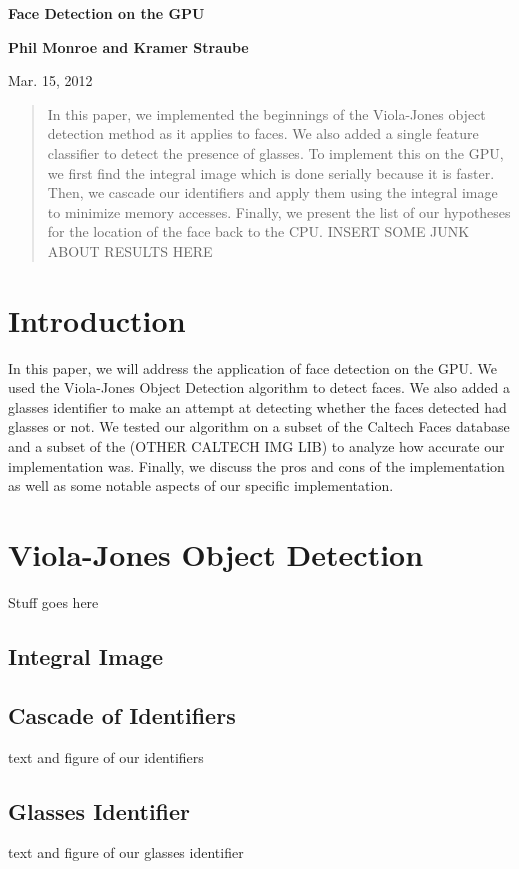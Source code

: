 \documentclass[12pt] {article}
\begin{document}
\centerline{\Large \bf Face Detection on the GPU}

\centerline{\bf Phil Monroe and Kramer Straube}

\centerline{Mar. 15, 2012}
\bigskip

\begin{abstract}
In this paper, we implemented the beginnings of the Viola-Jones object detection method as it applies to faces. We also added a single feature classifier to detect the presence of glasses. To implement this on the GPU, we first find the integral image which is done serially because it is faster. Then, we cascade our identifiers and apply them using the integral image to minimize memory accesses. Finally, we present the list of our hypotheses for the location of the face back to the CPU. INSERT SOME JUNK ABOUT RESULTS HERE
\end{abstract}

\section{Introduction}
In this paper, we will address the application of face detection on the GPU. We used the Viola-Jones Object Detection algorithm to detect faces. We also added a glasses identifier to make an attempt at detecting whether the faces detected had glasses or not. We tested our algorithm on a subset of the Caltech Faces database and a subset of the (OTHER CALTECH IMG LIB) to analyze how accurate our implementation was. Finally, we discuss the pros and cons of the implementation as well as some notable aspects of our specific implementation.

\section{Viola-Jones Object Detection}
Stuff goes here
\subsection{Integral Image}

\subsection{Cascade of Identifiers}
text and figure of our identifiers

\subsection{Glasses Identifier}
text and figure of our glasses identifier
\end{document}

